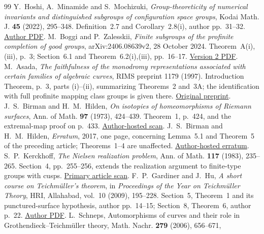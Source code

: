 \documentclass[11pt,a4paper]{article}
\theoremstyle{definition}
\theoremstyle{remark}
\begin{document}
\begin{thebibliography}{99}
 Y.~Hoshi, A.~Minamide and S.~Mochizuki,
\emph{Group-theoreticity of numerical invariants and distinguished
subgroups of configuration space groups}, Kodai Math. J.
\textbf{45} (2022), 295--348. Definition~2.7 and
Corollary~2.8(i), author pp.~31--32.
\href{https://www.kurims.kyoto-u.ac.jp/~motizuki/Numerical\%20invariants\%20and\%20distinguished\%20subgroups\%20of\%20configuration\%20spaces.pdf}{Author PDF}.
 M.~Boggi and P.~Zalesskii,
\emph{Finite subgroups of the profinite completion of good groups},
arXiv:2406.08639v2, 28 October 2024. Theorem~A(i),(iii),
p.~3; Section~6.1 and Theorem~6.2(i),(iii), pp.~16--17.
\href{https://arxiv.org/pdf/2406.08639v2}{Version 2 PDF}.
 M.~Asada,
\emph{The faithfulness of the monodromy representations associated
with certain families of algebraic curves}, RIMS preprint 1179
(1997). Introduction Theorem, p.~3, parts (i)--(ii), summarizing
Theorems~2 and~3A; the identification with full profinite
mapping class groups is given there.
\href{https://www.kurims.kyoto-u.ac.jp/preprint/file/RIMS1179.ps.gz}{Original preprint}.
 J.~S.~Birman and H.~M.~Hilden,
\emph{On isotopies of homeomorphisms of Riemann surfaces},
Ann. of Math. \textbf{97} (1973), 424--439.
Theorem~1, p.~424, and the extremal-map proof on p.~433.
\href{https://www.math.columbia.edu/~jb/bir-hilden-annals.pdf}{Author-hosted scan}.
 J.~S.~Birman and H.~M.~Hilden,
\emph{Erratum}, 2017, one page, concerning Lemma~5.1 and
Theorem~5 of the preceding article; Theorems~1--4 are unaffected.
\href{https://www.math.columbia.edu/~jb/bh-erratum.pdf}{Author-hosted erratum}.
 S.~P.~Kerckhoff,
\emph{The Nielsen realization problem}, Ann. of Math.
\textbf{117} (1983), 235--265. Section~4, pp.~255--256,
extends the realization argument to finite-type groups with cusps.
\href{https://people.math.harvard.edu/~ctm/home/text/others/kerckhoff/nielsen/nielsen.pdf}{Primary article scan}.
 F.~P.~Gardiner and J.~Hu,
\emph{A short course on Teichm\"uller's theorem},
in \emph{Proceedings of the Year on Teichm\"uller Theory},
HRI, Allahabad, vol.~10 (2009), 195--228.
Section~5, Theorem~1 and its punctured-surface hypothesis,
author pp.~14--15; Section~8, Theorem~6, author p.~22.
\href{https://userhome.brooklyn.cuny.edu/gardiner/A\%20short\%20course\%20on\%20Teichmuller\%27s\%20theorem.pdf}{Author PDF}.
 L.~Schneps,
Automorphisms of curves and their role in Grothendieck--Teichm\"uller
theory, Math. Nachr. \textbf{279} (2006), 656--671,

\end{thebibliography}
\end{document}
